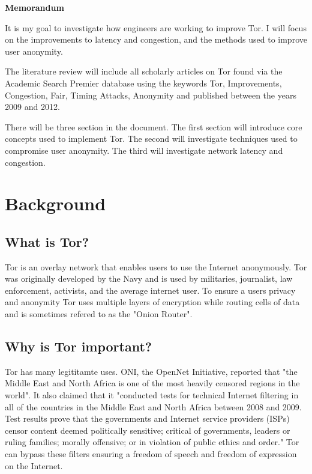 \documentclass[letterpaper,12pt]{texMemo}
\begin{document}
\singlespace
\begin{center}
\large {\bf Memorandum}
\end{center}
\setlength{\topmargin}{0in}
\maketitle

It is my goal to investigate how engineers are working to improve Tor. I will focus on the
improvements to latency and congestion, and the methods used to improve user anonymity.

The literature review will include all scholarly articles on Tor found via the Academic Search
Premier database using the keywords Tor, Improvements, Congestion, Fair, Timing Attacks,
Anonymity and published between the years 2009 and 2012.

There will be three section in the document. The first section will introduce core concepts used
to implement Tor. The second will investigate techniques used to compromise user
anonymity. The third will investigate network latency and congestion.

\section*{Background}

    \subsection*{What is Tor?}
    Tor is an overlay network that enables users to use the Internet anonymously. Tor was originally
    developed by the Navy and is used by militaries, journalist, law enforcement, activists, and the
    average internet user\citep[2]{tor:web}. To ensure a users privacy and anonymity Tor uses multiple
    layers of encryption while routing cells of data and is sometimes refered to as the "Onion Router".

    \subsection*{Why is Tor important?}
    Tor has many legititamte uses. ONI, the OpenNet Initiative, reported that "the Middle East and
    North Africa is one of the most heavily censored regions in the world". It also claimed that it
    "conducted tests for technical Internet filtering in all of the countries in the Middle East
    and North Africa between 2008 and 2009. Test results prove that the governments and Internet
    service providers (ISPs) censor content deemed politically sensitive; critical of governments,
    leaders or ruling families; morally offensive; or in violation of public ethics and order." Tor
    can bypass these filters ensuring a freedom of speech and freedom of expression on the Internet.
\end{document}
